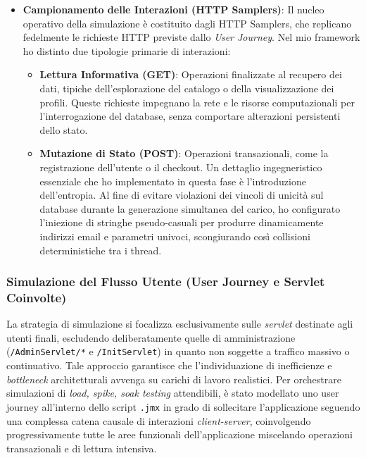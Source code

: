 \begin{itemize}
	\item \textbf{Campionamento delle Interazioni (HTTP Samplers)}: Il nucleo operativo della simulazione è costituito dagli HTTP Samplers, che replicano fedelmente le richieste HTTP previste dallo \textit{User Journey}. Nel mio framework ho distinto due tipologie primarie di interazioni:
	\begin{itemize}
		\item \textbf{Lettura Informativa (GET)}: Operazioni finalizzate al recupero dei dati, tipiche dell'esplorazione del catalogo o della visualizzazione dei profili. Queste richieste impegnano la rete e le risorse computazionali per l'interrogazione del database, senza comportare alterazioni persistenti dello stato.
		\item \textbf{Mutazione di Stato (POST)}: Operazioni transazionali, come la registrazione dell'utente o il checkout. Un dettaglio ingegneristico essenziale che ho implementato in questa fase è l'introduzione dell'entropia. Al fine di evitare violazioni dei vincoli di unicità sul database durante la generazione simultanea del carico, ho configurato l'iniezione di stringhe pseudo-casuali per produrre dinamicamente indirizzi email e parametri univoci, scongiurando così collisioni deterministiche tra i thread.
	\end{itemize}
\end{itemize}

\subsubsection{Simulazione del Flusso Utente (User Journey e Servlet Coinvolte)}

La strategia di simulazione si focalizza esclusivamente sulle \textit{servlet} destinate agli utenti finali, escludendo deliberatamente quelle di amministrazione (\texttt{/AdminServlet/*} e \texttt{/InitServlet}) in quanto non soggette a traffico massivo o continuativo. Tale approccio garantisce che l'individuazione di inefficienze e \textit{bottleneck} architetturali avvenga su carichi di lavoro realistici. Per orchestrare simulazioni di \textit{load, spike, soak testing} attendibili, è stato modellato uno user journey all'interno dello script \texttt{.jmx} in grado di sollecitare l'applicazione seguendo una complessa catena causale di interazioni \textit{client-server}, coinvolgendo progressivamente tutte le aree funzionali dell'applicazione miscelando operazioni transazionali e di lettura intensiva.

